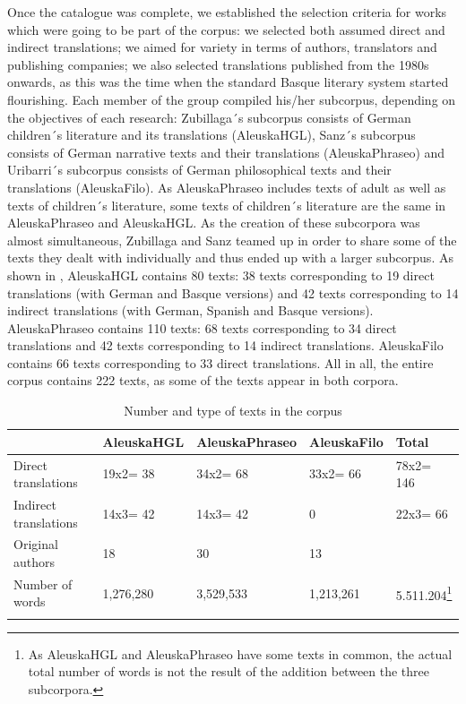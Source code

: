 \documentclass[output=paper]{LSP/langsci}
\begin{document}
Once the catalogue was complete, we established the selection criteria for works which were going to be part of the corpus: we selected both assumed direct and indirect translations; we aimed for variety in terms of authors, translators and publishing companies; we also selected translations published from the 1980s onwards, as this was the time when the standard Basque literary system started flourishing. Each member of the group compiled his/her subcorpus, depending on the objectives of each research: Zubillaga´s subcorpus consists of German children´s literature and its translations (AleuskaHGL), Sanz´s subcorpus consists of German narrative texts and their translations (AleuskaPhraseo) and Uribarri´s subcorpus consists of German philosophical texts and their translations (AleuskaFilo). As AleuskaPhraseo includes texts of adult as well as texts of children´s literature, some texts of children´s literature are the same in AleuskaPhraseo and AleuskaHGL. As the creation of these subcorpora was almost simultaneous, Zubillaga and Sanz teamed up in order to share some of the texts they dealt with individually and thus ended up with a larger subcorpus. As shown in , AleuskaHGL contains 80 texts: 38 texts corresponding to 19 direct translations (with German and Basque versions) and 42 texts corresponding to 14 indirect translations (with German, Spanish and Basque versions). AleuskaPhraseo contains 110 texts: 68 texts corresponding to 34 direct translations and 42 texts corresponding to 14 indirect translations. AleuskaFilo contains 66 texts corresponding to 33 direct translations. All in all, the entire corpus contains 222 texts, as some of the texts appear in both corpora.

\begin{table}
     \centering
     \begin{tabular}{lllll}
\lsptoprule
               & AleuskaHGL     & AleuskaPhraseo  & AleuskaFilo  & Total \\ 
\midrule
Direct translations	   & 19x2= 38  & 34x2= 68     & 33x2= 66     & 78x2= 146 \\
Indirect translations  & 14x3= 42  & 14x3= 42     & 0            & 22x3= 66   \\ 
Original authors       & 18        & 30           & 13           &             \\
Number of words 	   & 1,276,280 & 3,529,533    & 1,213,261	 & 5.511.204\footnote{As AleuskaHGL and AleuskaPhraseo have some texts in common, the actual total number of words is not the result of the addition between the three subcorpora.} \\
\lspbottomrule
     \end{tabular}

 \caption{Number and type of texts in the corpus}
     \label{tab:3.2}
\end{table}
\end{document}
